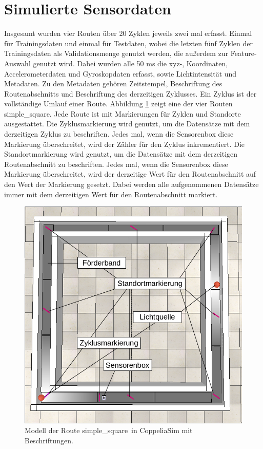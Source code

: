 \section{Simulierte Sensordaten}
Insgesamt wurden vier Routen über 20 Zyklen jeweils zwei mal erfasst.
Einmal für Trainingsdaten und einmal für Testdaten, wobei die letzten fünf Zyklen der
Trainingsdaten als Validationsmenge genutzt werden, die außerdem zur Feature-Auswahl genutzt wird.
Dabei wurden alle 50 ms die xyz-, Koordinaten, Accelerometerdaten und Gyroskopdaten erfasst, sowie Lichtintensität und Metadaten.
Zu den Metadaten gehören Zeitstempel, Beschriftung des Routenabschnitts und Beschriftung des derzeitigen Zyklusses.
Ein Zyklus ist der vollständige Umlauf einer Route.
\newline
\newline
Abbildung \ref{fig:simple_square_labeled} zeigt eine der vier Routen \glqq simple\_square\grqq.
Jede Route ist mit Markierungen für Zyklen und Standorte ausgestattet.
Die Zyklusmarkierung wird genutzt, um die Datensätze mit dem derzeitigen Zyklus zu beschriften.
Jedes mal, wenn die Sensorenbox diese Markierung überschreitet, wird der Zähler für den Zyklus inkrementiert.
Die Standortmarkierung wird genutzt, um die Datensätze mit dem derzeitigen Routenabschnitt zu beschriften.
Jedes mal, wenn die Sensorenbox diese Markierung überschreitet, wird der derzeitige Wert für den Routenabschnitt auf den Wert der Markierung gesetzt.
Dabei werden alle aufgenommenen Datensätze immer mit dem derzeitigen Wert für den Routenabschnitt markiert.
\begin{figure}[h!]
    \centering
    \includegraphics[width=\linewidth]{images/simple_square_labeled.png}
    \caption{Modell der Route \glqq simple\_square\grqq\ in CoppeliaSim mit Beschriftungen.}
    \label{fig:simple_square_labeled}
\end{figure}

